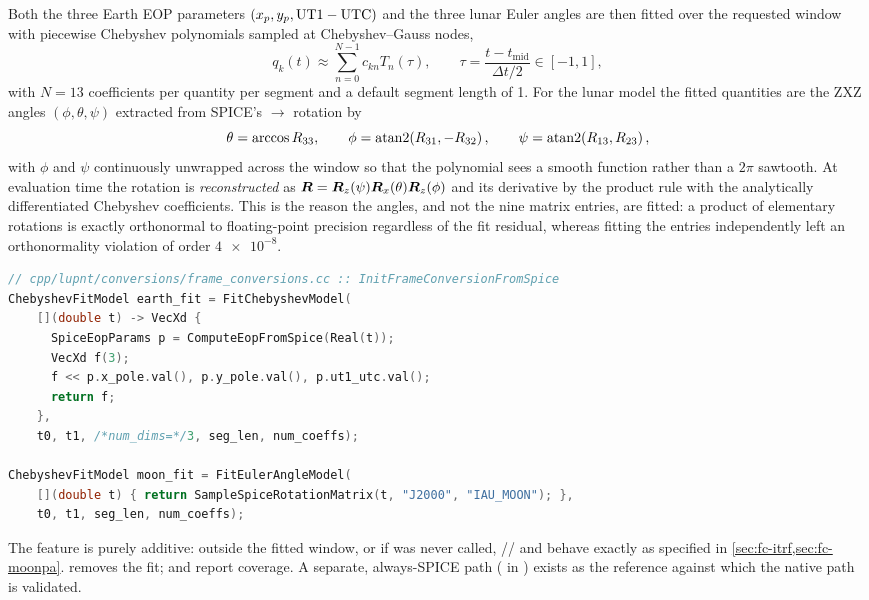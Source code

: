 Both the three Earth EOP parameters $(x_p, y_p, \mathrm{UT1}-\mathrm{UTC})$ and the three
lunar Euler angles are then fitted over the requested window with piecewise
Chebyshev polynomials sampled at Chebyshev--Gauss nodes,
%
\begin{equation}
  \label{eq:fc-cheb}
  q_k(t) \approx \sum_{n=0}^{N-1} c_{kn} T_n(\tau),
  \qquad
  \tau = \frac{t - t_{\mathrm{mid}}}{\Delta t/2} \in [-1,1],
\end{equation}
%
with $N = 13$ coefficients per quantity per segment and a default segment
length of \SI{1}{\dayunit}. For the lunar model the fitted quantities are
the ZXZ angles $(\phi,\theta,\psi)$ extracted from SPICE's
$\to$ rotation by
%
\begin{equation}
  \label{eq:fc-zxz}
  \theta = \arccos R_{33}, \qquad
  \phi = \operatorname{atan2}\!\left(R_{31}, -R_{32}\right), \qquad
  \psi = \operatorname{atan2}\!\left(R_{13}, R_{23}\right),
\end{equation}
%
with $\phi$ and $\psi$ continuously unwrapped across the window so that the
polynomial sees a smooth function rather than a $2\pi$ sawtooth. At
evaluation time the rotation is \emph{reconstructed} as
$\bm{R} = \bm{R}_z(\psi)\bm{R}_x(\theta)\bm{R}_z(\phi)$ and its
derivative by the product rule with the analytically differentiated
Chebyshev coefficients. This is the reason the angles, and not the nine
matrix entries, are fitted: a product of elementary rotations is exactly
orthonormal to floating-point precision regardless of the fit residual,
whereas fitting the entries independently left an orthonormality violation
of order $\num{4e-8}$.

\begin{lstlisting}[language=cpp, caption={Fitting the SPICE-derived Earth
  and lunar orientation
  (\texttt{cpp/lupnt/conversions/frame\_conversions.cc}).},
  label={lst:fc-spicefit}]
// cpp/lupnt/conversions/frame_conversions.cc :: InitFrameConversionFromSpice
ChebyshevFitModel earth_fit = FitChebyshevModel(
    [](double t) -> VecXd {
      SpiceEopParams p = ComputeEopFromSpice(Real(t));
      VecXd f(3);
      f << p.x_pole.val(), p.y_pole.val(), p.ut1_utc.val();
      return f;
    },
    t0, t1, /*num_dims=*/3, seg_len, num_coeffs);

ChebyshevFitModel moon_fit = FitEulerAngleModel(
    [](double t) { return SampleSpiceRotationMatrix(t, "J2000", "IAU_MOON"); },
    t0, t1, seg_len, num_coeffs);
\end{lstlisting}

The feature is purely additive: outside the fitted window, or if
 was never called,
// and
 behave exactly as specified in
\cref{sec:fc-itrf,sec:fc-moonpa}.  removes the
fit;  and 
report coverage. A separate, always-SPICE path
( in
) exists as the
reference against which the native path is validated.


